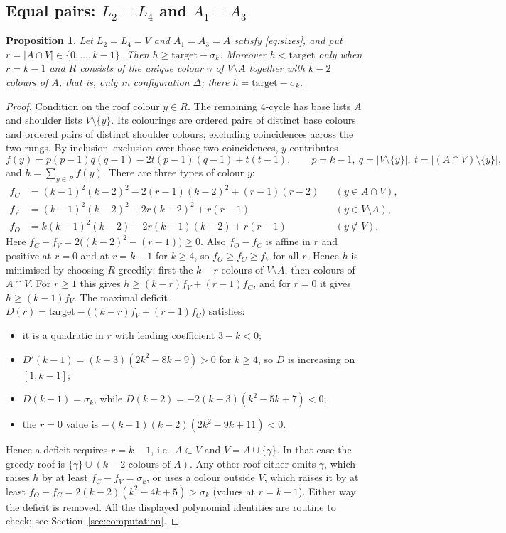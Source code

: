 \documentclass[11pt]{amsart}
\newtheorem{proposition}[theorem]{Proposition}
\theoremstyle{definition}
\theoremstyle{remark}
\newcommand{\1}{\mathbf 1}
\begin{document}
\subsection{\texorpdfstring{Equal pairs: $L_2=L_4$ and $A_1=A_3$}{Equal pairs}}
\begin{proposition}\label{prop:equalpairs}
Let $L_2=L_4=V$ and $A_1=A_3=A$ satisfy \eqref{eq:sizes}, and put $r=|A\cap V|\in\{0,\dots,k-1\}$. Then
$h\ge\mathrm{target}-\sigma_k$. Moreover $h<\mathrm{target}$ only when $r=k-1$ and $R$ consists of
the unique colour $\gamma$ of $V\setminus A$ together with $k-2$ colours of $A$, that is, only in
configuration $\Delta$; there $h=\mathrm{target}-\sigma_k$.
\end{proposition}
\begin{proof}
Condition on the roof colour $y\in R$. The remaining $4$-cycle has base lists $A$ and shoulder lists
$V\setminus\{y\}$. Its colourings are ordered pairs of distinct base colours and ordered pairs of distinct
shoulder colours, excluding coincidences across the two rungs. By inclusion--exclusion over those two
coincidences, $y$ contributes
\[
f(y)=p(p-1)q(q-1)-2t(p-1)(q-1)+t(t-1),\qquad p=k-1,\ q=|V\setminus\{y\}|,\ t=|(A\cap V)\setminus\{y\}|,
\]
and $h=\sum_{y\in R}f(y)$. There are three types of colour $y$:
\[
\begin{aligned}
f_{C}&=(k-1)^2(k-2)^2-2(r-1)(k-2)^2+(r-1)(r-2) &&(y\in A\cap V),\\
f_{V}&=(k-1)^2(k-2)^2-2r(k-2)^2+r(r-1) &&(y\in V\setminus A),\\
f_{O}&=k(k-1)^2(k-2)-2r(k-1)(k-2)+r(r-1) &&(y\notin V).
\end{aligned}
\]
Here $f_C-f_V=2\bigl((k-2)^2-(r-1)\bigr)\ge0$. Also $f_O-f_C$ is affine in $r$ and positive at $r=0$ and at
$r=k-1$ for $k\ge4$, so $f_O\ge f_C\ge f_V$ for all $r$. Hence $h$ is minimised by choosing $R$ greedily: first the $k-r$ colours of
$V\setminus A$, then colours of $A\cap V$. For $r\ge1$ this gives $h\ge(k-r)f_V+(r-1)f_C$, and for $r=0$
it gives $h\ge(k-1)f_V$. The maximal deficit $D(r)=\mathrm{target}-\bigl((k-r)f_V+(r-1)f_C\bigr)$
satisfies:
\begin{itemize}
\item it is a quadratic in $r$ with leading coefficient $3-k<0$;
\item $D'(k-1)=(k-3)(2k^2-8k+9)>0$ for $k\ge4$, so $D$ is increasing on $[1,k-1]$;
\item $D(k-1)=\sigma_k$, while $D(k-2)=-2(k-3)(k^2-5k+7)<0$;
\item the $r=0$ value is $-(k-1)(k-2)(2k^2-9k+11)<0$.
\end{itemize}
Hence a deficit requires $r=k-1$, i.e.\ $A\subset V$ and $V=A\cup\{\gamma\}$. In that case the greedy
roof is $\{\gamma\}\cup(k-2 \text{ colours of } A)$. Any other roof either omits $\gamma$, which raises
$h$ by at least $f_C-f_V=\sigma_k$, or uses a colour outside $V$, which raises it by at least
$f_O-f_C=2(k-2)(k^2-4k+5)>\sigma_k$ (values at $r=k-1$). Either way the deficit is removed. All the displayed polynomial identities are
routine to check; see Section~\ref{sec:computation}.
\end{proof}
\end{document}
